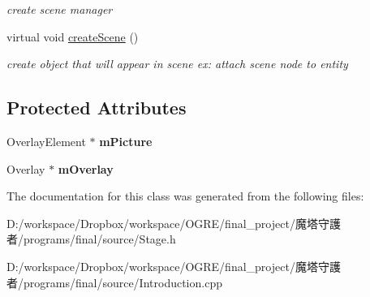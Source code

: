 \begin{DoxyCompactItemize}
\begin{DoxyCompactList}\small\item\em create scene manager \end{DoxyCompactList}\item 
\hypertarget{class_introduction_a3168f1b916d14b8a76832632026e6ba2}{
virtual void \hyperlink{class_introduction_a3168f1b916d14b8a76832632026e6ba2}{createScene} ()}
\label{class_introduction_a3168f1b916d14b8a76832632026e6ba2}

\begin{DoxyCompactList}\small\item\em create object that will appear in scene ex: attach scene node to entity \end{DoxyCompactList}\end{DoxyCompactItemize}
\subsection*{Protected Attributes}
\begin{DoxyCompactItemize}
\item 
\hypertarget{class_introduction_a149b8424734fe0418781e881a384693f}{
OverlayElement $\ast$ {\bfseries mPicture}}
\label{class_introduction_a149b8424734fe0418781e881a384693f}

\item 
\hypertarget{class_introduction_a7fe226c211f43789563b3d2001520599}{
Overlay $\ast$ {\bfseries mOverlay}}
\label{class_introduction_a7fe226c211f43789563b3d2001520599}

\end{DoxyCompactItemize}


The documentation for this class was generated from the following files:\begin{DoxyCompactItemize}
\item 
D:/workspace/Dropbox/workspace/OGRE/final\_\-project/魔塔守護者/programs/final/source/Stage.h\item 
D:/workspace/Dropbox/workspace/OGRE/final\_\-project/魔塔守護者/programs/final/source/Introduction.cpp\end{DoxyCompactItemize}
